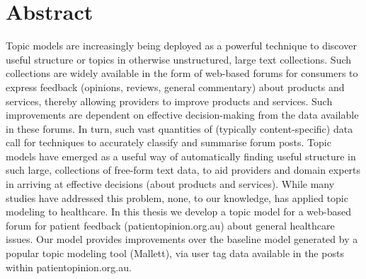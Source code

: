 \documentclass[11pt,twoside]{report}
\begin{document}
\tableofcontents
\listoffigures
\listoftables

\chapter*{Abstract}
Topic models are increasingly being deployed as a powerful technique to discover useful structure or topics in otherwise unstructured, large text collections. Such collections are widely available in the form of web-based forums for consumers to express feedback (opinions, reviews, general commentary) about products and services, thereby allowing providers to improve products and services. Such improvements are dependent on effective decision-making from the data available in these forums. In turn, such vast quantities of (typically content-specific) data call for techniques to accurately classify and summarise forum posts. Topic models have emerged as a useful way of automatically finding useful structure in such large, collections of free-form text data, to aid providers and domain experts in arriving at effective decisions (about products and services). While many studies have addressed this problem, none, to our knowledge, has applied topic modeling to healthcare. In this thesis we develop a topic model for a web-based forum for patient feedback (patientopinion.org.au) about general healthcare issues. Our model provides improvements over the baseline model generated by a popular topic modeling tool (Mallett), via user tag data available in the posts within patientopinion.org.au.  

\end{document}

